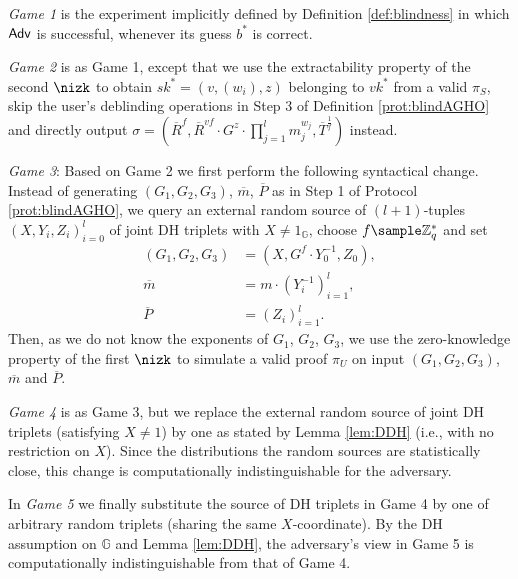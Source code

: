 \begin{description}
\item
\emph{Game 1} is the experiment implicitly defined by Definition \ref{def:blindness} in which $\mathsf{Adv}$ is successful, whenever its guess $b^*$ is correct.

\item
\emph{Game 2} is as Game 1, except that we use the extractability property of the second $\nizk$  to obtain $sk^*=(v,(w_i),z)$ belonging to $vk^*$ from a valid $\pi_S$, skip the user's deblinding operations in Step 3 of Definition \ref{prot:blindAGHO} and directly output $\sigma = (\overline R^f, \overline R^{vf} \cdot G^z\cdot \prod_{j=1}^l m_j^{w_j}, \overline T^\frac{1}{f})$ instead.

\item
\emph{Game 3}:
Based on Game 2 we first perform the following syntactical change.
Instead of generating $(G_1,G_2,G_3)$, $\overline m$, $\overline P$ as in Step 1 of Protocol \ref{prot:blindAGHO}, we query an external random source of $(l+1)$-tuples $(X,Y_i,Z_i)_{i=0}^l$ of joint DH triplets with $X\neq 1_\mathbb{G}$, choose $f\sample \Z_q^*$ and set
\begin{align*}
(G_1,G_2,G_3) &= (X, G^f\cdot Y_0^{-1}, Z_0),
\\
\overline m &= m\cdot (Y_i^{-1})_{i=1}^l,
\\
\overline P &= (Z_i)_{i=1}^l.
\end{align*} 
Then, as we do not know the exponents of $G_1$, $G_2$, $G_3$, we use the zero-knowledge property of the first $\nizk$ to simulate a valid proof $\pi_U$ on input $(G_1,G_2,G_3)$, $\overline m$ and $\overline P$.

\item
\emph{Game 4} is as Game 3, but we replace the external random source of joint DH triplets (satisfying $X\neq 1$) by one as stated by Lemma \ref{lem:DDH} (i.e., with no restriction on $X$). 
Since the distributions the random sources are statistically close, this change is computationally indistinguishable for the adversary. 

\item
In \emph{Game 5} we finally substitute the source of DH triplets in Game 4 by one of arbitrary random triplets (sharing the same $X$-coordinate).
By the DH assumption on $\mathbb G$ and Lemma \ref{lem:DDH}, the adversary's view in Game 5 is computationally indistinguishable from that of Game 4.
\end{description}

